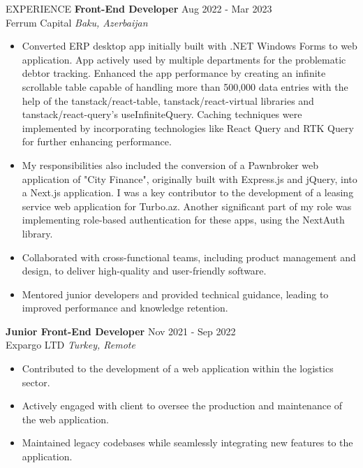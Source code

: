 \documentclass{resume} %
\begin{document}
\begin{rSection}{EXPERIENCE}
\textbf{Front-End Developer} \hfill Aug 2022 - Mar 2023\\
Ferrum Capital \hfill \textit{Baku, Azerbaijan}
 \begin{itemize}
    \itemsep -3pt {} 
    \item 
    Converted ERP desktop app initially built with .NET Windows Forms to web application. App actively used by multiple departments for the problematic debtor tracking. Enhanced the app performance by creating an infinite scrollable table capable of handling more than 500,000 data entries with the help of the tanstack/react-table, tanstack/react-virtual libraries and tanstack/react-query's useInfiniteQuery. Caching techniques were implemented by incorporating technologies like React Query and RTK Query for further enhancing performance.
    \item 
    My responsibilities also included the conversion of a Pawnbroker web application of "City Finance", originally built with Express.js and jQuery, into a Next.js application. I was a key contributor to the development of a leasing service web application for Turbo.az. Another significant part of my role was implementing role-based authentication for these apps, using the NextAuth library.
     \item Collaborated with cross-functional teams, including product management and design, to deliver high-quality and user-friendly software.
     \item Mentored junior developers and provided technical guidance, leading to improved performance and knowledge retention.
 \end{itemize}
 \vspace{2.5em}
\textbf{Junior Front-End Developer} \hfill Nov 2021 - Sep 2022\\
Expargo LTD \hfill \textit{Turkey, Remote}
 \begin{itemize}
    \itemsep -3pt {} 
     \item Contributed to the development of a web application within the logistics sector. 
     \item Actively engaged with client to oversee the production and maintenance of the web application.
     \item Maintained legacy codebases while seamlessly integrating new features to the application.
 \end{itemize}

\end{rSection} 

\end{document}
